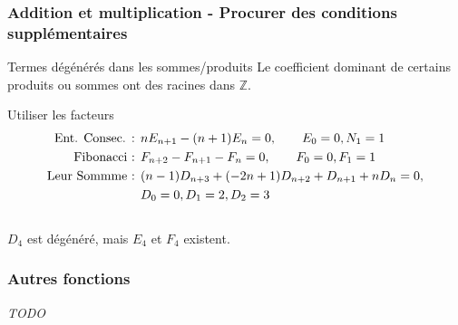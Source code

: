 \documentclass{beamer}
\begin{document}

\begin{frame}
\frametitle{Addition et multiplication - Procurer des conditions supplémentaires}
\begin{center}
\begin{alertblock}{Termes dégénérés dans les sommes/produits}
    Le coefficient dominant de certains produits ou sommes ont des racines dans $\mathbb Z$.
\end{alertblock}
\begin{exampleblock}{Utiliser les facteurs}
    \begin{align*}
        \textnormal{Ent. Consec. : } &nE_{n+1} - (n+1)E_n = 0,\qquad E_0 = 0, N_1 = 1\\
        \textnormal{Fibonacci : } &F_{n+2} - F_{n+1} - F_n = 0,\qquad F_0=0, F_1=1\\
        \textnormal{Leur Sommme : } &(n - 1)D_{n+3} + (-2n + 1)D_{n+2} + D_{n+1} + nD_n = 0, \\
        &D_0 = 0, D_1 = 2, D_2 = 3\\
    \end{align*}\\
    \vspace{-0.7cm}
    $D_4$ est dégénéré, mais $E_4$ et $F_4$ existent.
\end{exampleblock}
\end{center}
\end{frame}


\begin{frame}
\frametitle{Autres fonctions}
\begin{center}
\emph{TODO}
\end{center}
\end{frame}
\end{document}
